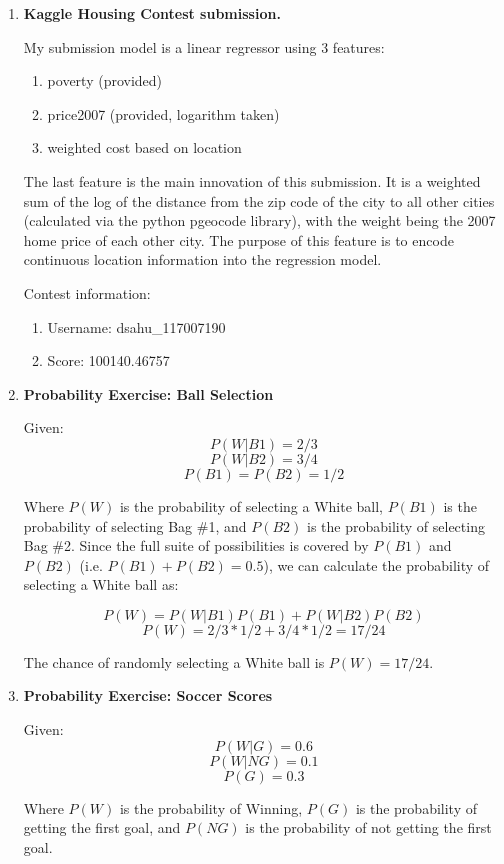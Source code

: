 \documentclass[12pt]{article}
\begin{document}
\begin{enumerate}[leftmargin=\labelsep]
\begin{enumerate}[label=(\alph*)]
  \end{enumerate}

\item \textbf{Kaggle Housing Contest submission.}

  My submission model is a linear regressor using 3 features:
  \begin{enumerate}
    \item poverty (provided)
    \item price2007 (provided, logarithm taken)
    \item weighted cost based on location
  \end{enumerate}

  The last feature is the main innovation of this submission. It is a weighted sum of the log of the distance from the zip code of the city to all other cities (calculated via the python pgeocode library), with the weight being the 2007 home price of each other city. The purpose of this feature is to encode continuous location information into the regression model. 

  Contest information:
  \begin{enumerate}
    \item Username: dsahu\_117007190
    \item Score: 100140.46757
  \end{enumerate}

\item \textbf{Probability Exercise: Ball Selection}

  Given:
    \[ P(W | B1) = 2/3 \]
    \[ P(W | B2) = 3/4 \]
    \[ P(B1) = P(B2) = 1/2 \]

  Where \(P(W)\) is the probability of selecting a White ball, \(P(B1)\) is the probability of selecting Bag \#1, and \(P(B2)\) is the probability of selecting Bag \#2.
  Since the full suite of possibilities is covered by \(P(B1)\) and \(P(B2)\) (i.e. \( P(B1) + P(B2) = 0.5 \)), we can calculate the probability of selecting a White ball as:

    \[ P(W) = P(W | B1) P(B1) + P(W | B2) P(B2) \]
    \[ P(W) = 2/3 * 1/2 + 3/4 * 1/2 = 17/24 \]

  The chance of randomly selecting a White ball is \(P(W) = 17/24\).

\item \textbf{Probability Exercise: Soccer Scores}

  Given:
    \[ P(W | G) = 0.6 \]
    \[ P(W | NG) = 0.1 \]
    \[ P(G) = 0.3 \]

  Where \(P(W)\) is the probability of Winning, \(P(G)\) is the probability of getting the first goal, and \(P(NG)\) is the probability of not getting the first goal.
  

\end{enumerate}
\end{document}
